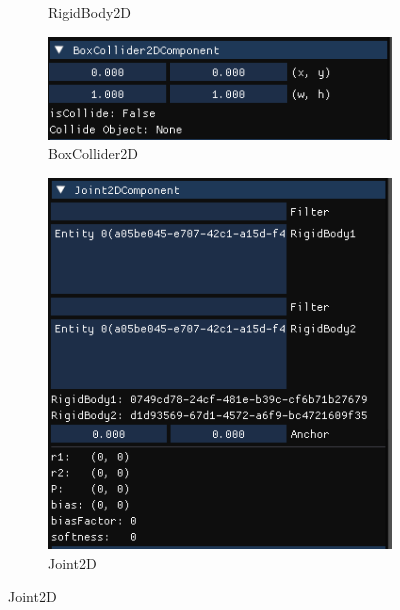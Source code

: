 \begin{figure}[h]
\begin{subfigure}[b]{0.24\linewidth}
\begin{center}
        \caption{RigidBody2D}
        \end{center}
    \end{subfigure}
    \begin{subfigure}[b]{0.24\linewidth}
        \begin{center}
        \includegraphics[width=\linewidth]{./resources/editor/ins_boxCollider2D.png}
        \caption{BoxCollider2D}
        \end{center}
    \end{subfigure}
    \begin{subfigure}[b]{0.24\linewidth}
        \begin{center}
        \includegraphics[width=\linewidth]{./resources/editor/ins_joint2D.png}
        \caption{Joint2D}
        \end{center}
    \end{subfigure}

\end{figure}
